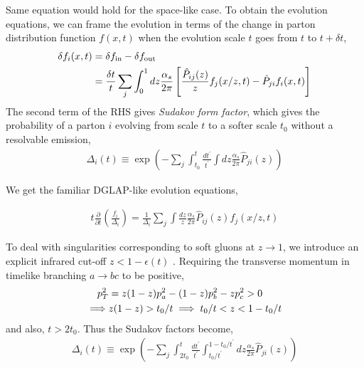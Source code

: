 Same equation would hold for the space-like case. 
%
To obtain the evolution equations, we can frame the evolution in terms of the change in parton distribution function \(f(x,t)\) when the evolution scale \(t\) goes from \(t\) to \(t+\delta t\),
%
\begin{align}
	\delta f_i(x, t) &= \delta f_\mathrm{in} - \delta f_\mathrm{out} \notag\\
	&=\frac{\delta t}{t} \sum_j \int_{0}^{1} dz \frac{\alpha_s}{2\pi} \left[\frac{\hat{P}_{ij}(z)}{z}f_j(x/z, t) - \hat{P}_{ji}f_i(x,t)\right]
 \end{align}
The second term of the RHS gives \emph{Sudakov form factor}, which gives the probability of a parton \(i\) evolving from scale \(t\) to a softer scale \(t_0\) without a resolvable emission,
%
\begin{align}
	\Delta_i(t) \equiv \exp(-\sum_j\int_{t_0}^{t} \frac{dt^\prime}{t^\prime}\int dz\frac{\alpha_s}{2\pi} \hat{P}_{ji}(z))
\end{align}

We get the familiar DGLAP-like evolution equations,

\begin{align}
	t\frac{\partial}{\partial t}\left(\frac{f_i}{\Delta_i}\right) = \frac{1}{\Delta_i}\sum_j \int \frac{dz}{z}\frac{\alpha_s}{2\pi}
\hat{P}_{ij}(z)f_j(x/z, t)\end{align}


To deal with singularities corresponding to soft gluons at \(z\to 1\), we introduce an explicit infrared cut-off \(z < 1-\epsilon(t)\) .  Requiring the transverse momentum in timelike branching \(a\to bc\) to be positive, 
\begin{align}
	p_T^2 &= z(1-z)p_a^2 - (1-z)p_b^2 - zp_c^2 > 0 \notag\\
	\implies& z(1-z) > t_0/t \implies t_0/t < z < 1 - t_0/t
\end{align} 
and also, \(t > 2t_0\). Thus the Sudakov factors become,
%
\begin{align}
	\Delta_i(t) \equiv \exp(-\sum_j\int_{2t_0}^{t}
	\frac{dt^\prime}{t^\prime}
	\int_{t_0/t^\prime}^{1-t_0/t^\prime} dz
	\frac{\alpha_s}{2\pi} \hat{P}_{ji}(z))
	\label{eq:col`inearSudakov}
\end{align}


